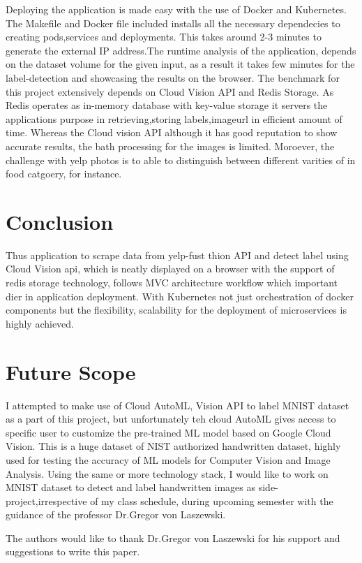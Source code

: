 Deploying the application is made easy with the use of Docker and
Kubernetes.  The Makefile and Docker file included installs all the
necessary dependecies to creating pods,services and deployments. This
takes around 2-3 minutes to generate the external IP address.The
runtime analysis of the application, depends on the dataset volume for
the given input, as a result it takes few minutes for the
label-detection and showcasing the results on the browser. The
benchmark for this project extensively depends on Cloud Vision API and
Redis Storage. As Redis operates as in-memory database with key-value
storage it servers the applications purpose in retrieving,storing
labels,imageurl in efficient amount of time. Whereas the Cloud vision
API although it has good reputation to show accurate results, the bath
processing for the images is limited. Moroever, the challenge with
yelp photos is to able to distinguish between different varities of in
food catgoery, for instance.

\section{Conclusion}

Thus application to scrape data from yelp-fust thion API and detect label
using Cloud Vision api, which is neatly displayed on a browser with
the support of redis storage technology, follows MVC architecture
workflow which important dier in application deployment. With
Kubernetes not just orchestration of docker components but the
flexibility, scalability for the deployment of microservices is highly
achieved.
  
\section{Future Scope}

I attempted to make use of Cloud AutoML, Vision API to label MNIST
dataset as a part of this project, but unfortunately teh cloud AutoML
gives access to specific user to customize the pre-trained ML model
based on Google Cloud Vision. This is a huge dataset of NIST
authorized handwritten dataset, highly used for testing the accuracy
of ML models for Computer Vision and Image Analysis. Using the same or
more technology stack, I would like to work on MNIST dataset to detect
and label handwritten images as side-project,irrespective of my class
schedule, during upcoming semester with the guidance of the professor
Dr.Gregor von Laszewski.

\begin{acks}

  The authors would like to thank Dr.Gregor von Laszewski for his
  support and suggestions to write this paper.
  
\end{acks}




